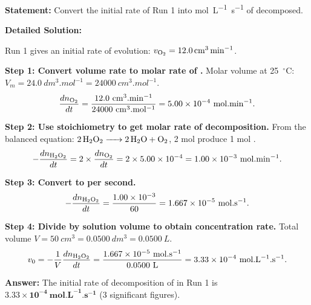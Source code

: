 \documentclass[11pt]{article}
\begin{document}
\begin{exoresolu}
\textbf{Statement:} Convert the initial rate of Run 1 into \si{mol.L^{-1}.s^{-1}} of  decomposed.

\tcblower
\textbf{Detailed Solution:}

Run 1 gives an initial rate of  evolution: $v_{\ce{O2}} = \SI{12.0}{cm^3.min^{-1}}$.

\textbf{Step 1: Convert volume rate to molar rate of .}
Molar volume at \SI{25}{\ensuremath{{}^{\circ}\mathrm{C}}}: $V_m = \SI{24.0}{dm^3.mol^{-1}} = \SI{24000}{cm^3.mol^{-1}}$.
\[
\frac{dn_{\ce{O2}}}{dt} = \frac{12.0\ \mathrm{cm^3.min^{-1}}}{24000\ \mathrm{cm^3.mol^{-1}}} = 5.00 \times 10^{-4}\ \mathrm{mol.min^{-1}}.
\]

\textbf{Step 2: Use stoichiometry to get molar rate of  decomposition.}
From the balanced equation: $\ce{2H2O2 -> 2H2O + O2}$, 2 mol  produce 1 mol .
\[
-\frac{dn_{\ce{H2O2}}}{dt} = 2 \times \frac{dn_{\ce{O2}}}{dt} = 2 \times 5.00 \times 10^{-4} = 1.00 \times 10^{-3}\ \mathrm{mol.min^{-1}}.
\]

\textbf{Step 3: Convert to per second.}
\[
-\frac{dn_{\ce{H2O2}}}{dt} = \frac{1.00 \times 10^{-3}}{60} = 1.667 \times 10^{-5}\ \mathrm{mol.s^{-1}}.
\]

\textbf{Step 4: Divide by solution volume to obtain concentration rate.}
Total volume $V = \SI{50}{cm^3} = \SI{0.0500}{dm^3} = \SI{0.0500}{L}$.
\[
v_0 = -\frac{1}{V}\frac{dn_{\ce{H2O2}}}{dt} = \frac{1.667 \times 10^{-5}\ \mathrm{mol.s^{-1}}}{0.0500\ \mathrm{L}} = 3.33 \times 10^{-4}\ \mathrm{mol.L^{-1}.s^{-1}}.
\]

\textbf{Answer:} The initial rate of decomposition of  in Run 1 is $\mathbf{3.33 \times 10^{-4}\ \si{mol.L^{-1}.s^{-1}}}$ (3 significant figures).
\end{exoresolu}
\end{document}

